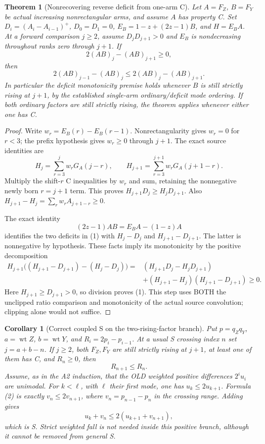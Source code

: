 \documentclass[11pt]{article}
\newtheorem{theorem}[proposition]{Theorem}
\newtheorem{corollary}[proposition]{Corollary}
\begin{document}
\begin{theorem}[Nonrecovering reverse deficit from one-arm C]
Let $A=F_Z$, $B=F_Y$ be actual increasing nonrectangular arms, and
assume $A$ has property C. Set $D_i=(A_i-A_{i-1})^+$,
$D_0=D_1=0$, $E_B=1-z+(2z-1)B$, and $H=E_BA$.
At a forward comparison $j\ge2$, assume
$D_jD_{j+1}>0$ and $E_B$ is nondecreasing throughout ranks
zero through $j+1$. If
\[
                    2(AB)_j-(AB)_{j+1}\ge0,
\]
then
\[
            2(AB)_{j-1}-(AB)_j
                       \le2(AB)_j-(AB)_{j+1}.           \tag{1}
\]
In particular the deficit monotonicity premise holds whenever $B$
is still strictly rising at $j+1$, by the established single-arm
ordinary/deficit mode ordering. If both ordinary factors are still
strictly rising, the theorem applies whenever either one has C.
\end{theorem}
\begin{proof}
Write $w_r=E_B(r)-E_B(r-1)$. Nonrectangularity gives $w_r=0$
for $r<3$; the prefix hypothesis gives $w_r\ge0$ through $j+1$.
The exact source identities are
\[
 H_j=\sum_{r=3}^j w_rG_A(j-r),\qquad
 H_{j+1}=\sum_{r=3}^{j+1}w_rG_A(j+1-r).
\]
Multiply the shift-$r$ C inequalities by $w_r$ and sum, retaining
the nonnegative newly born $r=j+1$ term. This proves
$H_{j+1}D_j\ge H_jD_{j+1}$. Also
$H_{j+1}-H_j=\sum_rw_rA_{j+1-r}\ge0$.

The exact identity
\[
                    (2z-1)AB=E_BA-(1-z)A
\]
identifies the two deficits in (1) with $H_j-D_j$ and
$H_{j+1}-D_{j+1}$. The latter is nonnegative by hypothesis.
These facts imply its monotonicity by the positive decomposition
\[
\begin{split}
 H_{j+1}\bigl((H_{j+1}-D_{j+1})-(H_j-D_j)\bigr)
  ={}&(H_{j+1}D_j-H_jD_{j+1})\\
    &+(H_{j+1}-H_j)(H_{j+1}-D_{j+1})\ge0.
\end{split}
\]
Here $H_{j+1}\ge D_{j+1}>0$, so division proves (1).
This step uses BOTH the unclipped ratio comparison and monotonicity
of the actual source convolution; clipping alone would not suffice.
\end{proof}

\begin{corollary}[Correct coupled S on the two-rising-factor branch]
Put $p=q_Zq_Y$, $a=\operatorname{wt}Z$, $b=\operatorname{wt}Y$,
and $R_i=2p_i-p_{i-1}$. At a usual S crossing index $n$ set
$j=a+b-n$. If $j\ge2$, both $F_Z,F_Y$ are still strictly rising
at $j+1$, at least one of them has C, and $R_n\ge0$, then
\[
                         R_{n+1}\le R_n.                \tag{2}
\]
Assume, as in the A2 induction, that the OLD weighted positive
differences $2^iu_i$ are unimodal. For $k<\ell$, with $\ell$ their
first mode, one has $u_k\le2u_{k+1}$. Formula (2) is exactly
$v_n\le2v_{n+1}$, where $v_n=p_{n-1}-p_n$ in the crossing
range. Adding gives
\[
                    u_k+v_n\le2(u_{k+1}+v_{n+1}),
\]
which is S. Strict weighted fall is not needed inside this positive
branch, although it cannot be removed from general S.
\end{corollary}
\end{document}
